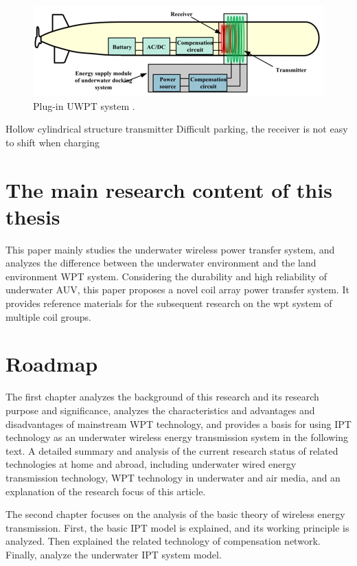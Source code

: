 \begin{figure}[htbp]
    \centering
    \includegraphics[width=0.7\linewidth]{images/1_plugin_UWPT_system.png}
    \caption{Plug-in UWPT system \cite{Wang}.}
    \label{fig:plug in UWPT system}
\end{figure}

Hollow cylindrical structure transmitter
Difficult parking, the receiver is not easy to shift when charging


\section{The main research content of this thesis}
This paper mainly studies the underwater wireless power transfer system, and analyzes the difference between the underwater environment and the land environment WPT system. Considering the durability and high reliability of underwater AUV, this paper proposes a novel coil array power transfer system. 
It provides reference materials for the subsequent research on the wpt system of multiple coil groups.

\section{Roadmap}
The first chapter analyzes the background of this research and its research purpose and significance, analyzes the characteristics and advantages and disadvantages of mainstream WPT technology, and provides a basis for using IPT technology as an underwater wireless energy transmission system in the following text. A detailed summary and analysis of the current research status of related technologies at home and abroad, including underwater wired energy transmission technology, WPT technology in underwater and air media, and an explanation of the research focus of this article.

The second chapter focuses on the analysis of the basic theory of wireless energy transmission. First, the basic IPT model is explained, and its working principle is analyzed. Then explained the related technology of compensation network. Finally, analyze the underwater IPT system model.


